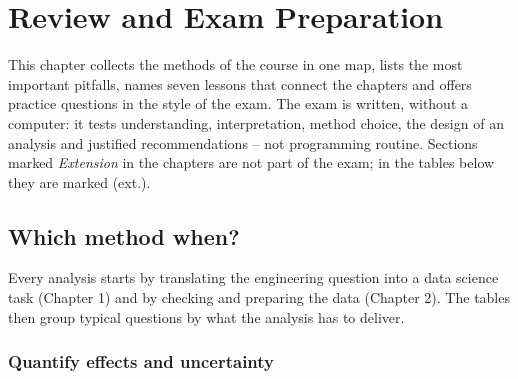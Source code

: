 \documentclass[
  letterpaper,
  DIV=11,
  numbers=noendperiod]{scrreprt}
\begin{document}
\chapter{Review and Exam Preparation}\label{review-and-exam-preparation}

This chapter collects the methods of the course in one map, lists the
most important pitfalls, names seven lessons that connect the chapters
and offers practice questions in the style of the exam. The exam is
written, without a computer: it tests understanding, interpretation,
method choice, the design of an analysis and justified recommendations
-- not programming routine. Sections marked \emph{Extension} in the
chapters are not part of the exam; in the tables below they are marked
(ext.).

\section{Which method when?}\label{which-method-when}

Every analysis starts by translating the engineering question into a
data science task (Chapter 1) and by checking and preparing the data
(Chapter 2). The tables then group typical questions by what the
analysis has to deliver.

\subsection{Quantify effects and
uncertainty}\label{quantify-effects-and-uncertainty}
\end{document}
